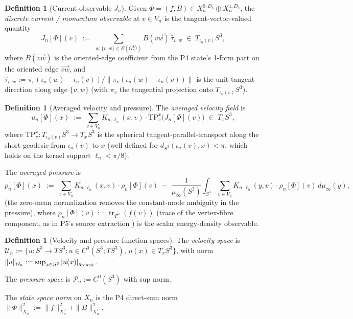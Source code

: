 \documentclass[11pt, a4paper]{amsart}
\theoremstyle{definition}
\newtheorem{definition}[theorem]{Definition}
\newcommand{\tr}{\operatorname{tr}}
\newcommand{\dsph}{d_{S^3}}
\begin{document}
\begin{definition}[Current observable $J_n$]
\label{def:Jn}
Given $\Phi = (f, B) \in X_n^{0, D_4} \oplus X_n^{1, D_4}$, the
\emph{discrete current / momentum observable} at $v \in V_n$ is
the tangent-vector-valued quantity
\[
  J_n[\Phi](v) \;:=\; \sum_{w : \{v, w\} \in E(G_n^{D_4})}
    B(\vec{vw})\,\hat\tau_{v, w} \;\in\; T_{\iota_n(v)} S^3,
\]
where $B(\vec{vw})$ is the oriented-edge coefficient from the
P4 state's 1-form part on the oriented edge $\vec{vw}$, and
$\hat\tau_{v, w} := \pi_v(\iota_n(w) - \iota_n(v)) /
\|\pi_v(\iota_n(w) - \iota_n(v))\|$ is the unit tangent
direction along edge $\{v, w\}$ (with $\pi_v$ the tangential
projection onto $T_{\iota_n(v)} S^3$).
\end{definition}

\begin{definition}[Averaged velocity and pressure]
\label{def:up}
The \emph{averaged velocity field} is
\[
  u_n[\Phi](x) \;:=\; \sum_{v \in V_n} K_{n, \ell_n}(x, v) \cdot
    \mathrm{TP}_v^x\bigl(J_n[\Phi](v)\bigr)
    \;\in\; T_x S^3,
\]
where $\mathrm{TP}_v^x \colon T_{\iota_n(v)} S^3 \to T_x S^3$ is
the spherical tangent-parallel-transport along the short
geodesic from $\iota_n(v)$ to $x$ (well-defined for
$\dsph(\iota_n(v), x) < \pi$, which holds on the kernel support
$\ell_n < \pi/8$).

The \emph{averaged pressure} is
\[
  p_n[\Phi](x) \;:=\; \sum_{v \in V_n} K_{n, \ell_n}(x, v)
    \cdot \rho_n[\Phi](v) \;-\; \frac{1}{\mu_\infty(S^3)}
    \int_{S^3} \sum_{v \in V_n} K_{n, \ell_n}(y, v) \cdot
    \rho_n[\Phi](v) \, d\mu_\infty(y),
\]
(the zero-mean normalization removes the constant-mode
ambiguity in the pressure), where $\rho_n[\Phi](v) :=
\tr_{F^0}(f(v))$ (trace of the
vertex-fibre component, as in P5's source extraction
\cite[Def.~3.2]{MetricProjection}) is the scalar
energy-density observable.
\end{definition}

\begin{definition}[Velocity and pressure function spaces]
\label{def:UP}
The \emph{velocity space} is
$\mathcal U_n := \{u \colon S^3 \to TS^3 : u \in C^0(S^3;
TS^3),\, u(x) \in T_x S^3\}$, with norm
$\|u\|_{\mathcal U_n} := \sup_{x \in S^3} |u(x)|_{g_{\rm round}}$.

The \emph{pressure space} is $\mathcal P_n := C^0(S^3)$ with
sup norm.

The \emph{state space norm} on $X_n$ is the P4 direct-sum norm
$\|\Phi\|_{X_n}^2 := \|f\|_{X_n^0}^2 + \|B\|_{X_n^1}^2$.
\end{definition}
\end{document}
